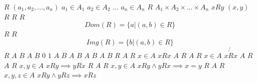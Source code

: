 \documentclass{article}
\begin{document}
$R$
$(a_1,a_2, \dots, a_n)$
$a_1 \in A_1$
$a_2 \in A_2$
$\dots$
$a_n \in A_n$
$R$
$A_1 \times A_2 \times \dots \times A_n$
$x R y$
$(x,y)$
$R$
$R$
$R$
$$
Dom(R) = \{a | (a,b) \in R\}
$$
$R$
$R$
$$
Img(R) = \{b | (a,b) \in R\}
$$
$R$
$A$
$B$
$A$
$B$
$0$
$1$
$A$
$B$
$A$
$B$
$A$
$B$
$A$
$B$
$R$
$A$
$R$
$x \in A$
$x R x$
$A$
$R$
$A$
$R$
$x \in A$
$x \not{R} x$
$A$
$R$
$A$
$R$
$x, y \in A$
$x R y \implies y R x$
$R$
$A$
$R$
$x, y \in A$
$x R y \land y R x \implies x = y$
$R$
$A$
$R$
$x, y, z \in A$
$x R y \land y R z \implies x R z$
\end{document}
